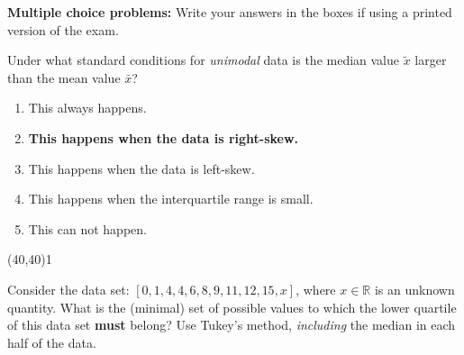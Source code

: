 \documentclass[addpoints]{exam}
\def\solutions{0}
\begin{document}
{\renewcommand{\arraystretch}{1.5}

\vspace{8mm}



\label{---Problems---}


\vspace{3cm}

{\begin{center} {\bf Multiple choice problems:} Write your answers in the boxes if using a printed version of the exam. \end{center}}\vspace{2mm}

\begin{questions}
\question[3]  Under what standard conditions for \textit{unimodal} data is the median value $\tilde{x}$ larger than the mean value $\bar{x}$?

\vspace{2mm}
\begin{minipage}[b]{.85\textwidth}
	\begin{enumerate}[label=\Alph*.]
		\item This always happens.
		\item \textbf{This happens when the data is right-skew.}
		\item This happens when the data is left-skew.
		\item This happens when the interquartile range is small.
		\item This can not happen.
	\end{enumerate}
\end{minipage}
\begin{minipage}[b]{.1\textwidth}
	\vspace{\fill}\framebox(40,40){\if\solutions1 \fi}
\end{minipage}

\question[3]  Consider the data set:  $[ 0,1,4,4,6, 8, 9, 11,12,15,x]$, where $x \in \mathbb{R}$ is an unknown quantity. What is the (minimal) set of possible values to which the lower quartile of this data set \textbf{must} belong?  Use Tukey's method, \textit{including} the median in each half of the data.
\vspace{2mm}


\end{questions}}
\end{document}
